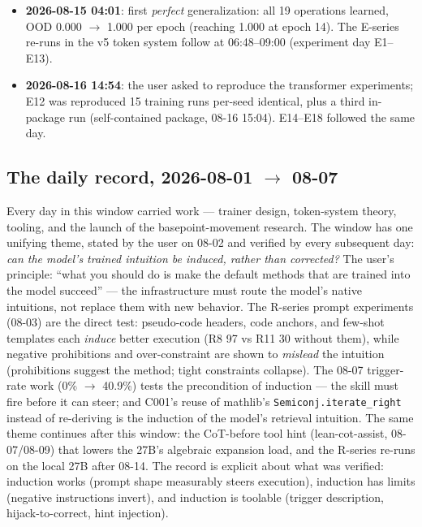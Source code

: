 \documentclass[sigplan,10pt,anonymous,review]{acmart}
\begin{document}
\begin{itemize}
distinct from the basepoint ($\mathrm{lambda}(\mathrm{base},
\mathrm{base})$), while the intended concept has none
($\mathrm{base}(\mathrm{base},\mathrm{base})$). Same day it becomes the
\texttt{pure-relative} branch of the Lean formalization (claim P001
PureBase; \texttt{C0NoGo}, \texttt{SelfRef}, \texttt{MinimalRuleAudit}).
\item \textbf{2026-08-15 04:01}: first \emph{perfect} generalization: all 19
operations learned, OOD 0.000 $\to$ 1.000 per epoch (reaching 1.000 at epoch
14). The E-series re-runs in the v5 token system follow at 06:48--09:00
(experiment day E1--E13).
\item \textbf{2026-08-16 14:54}: the user asked to reproduce the transformer
experiments; E12 was reproduced 15 training runs per-seed identical, plus a
third in-package run (self-contained package, 08-16 15:04). E14--E18
followed the same day.
\end{itemize}

\subsection{The daily record, 2026-08-01 $\to$ 08-07}

Every day in this window carried work --- trainer design, token-system
theory, tooling, and the launch of the basepoint-movement research. The
window has one unifying theme, stated by the user on 08-02 and verified
by every subsequent day: \emph{can the model's trained intuition be
induced, rather than corrected?} The user's principle: ``what you should
do is make the default methods that are trained into the model succeed''
--- the infrastructure must route the model's native intuitions, not
replace them with new behavior. The R-series prompt experiments (08-03)
are the direct test: pseudo-code headers, code anchors, and few-shot
templates each \emph{induce} better execution (R8 97 vs R11 30 without
them), while negative prohibitions and over-constraint are shown to
\emph{mislead} the intuition (prohibitions suggest the method; tight
constraints collapse). The 08-07 trigger-rate work (0\% $\to$ 40.9\%)
tests the precondition of induction --- the skill must fire before it can
steer; and C001's reuse of mathlib's \texttt{Semiconj.iterate\_right}
instead of re-deriving is the induction of the model's retrieval
intuition. The same theme continues after this window: the CoT-before
tool hint (lean-cot-assist, 08-07/08-09) that lowers the 27B's algebraic
expansion load, and the R-series re-runs on the local 27B after 08-14.
The record is explicit about what was verified: induction works (prompt
shape measurably steers execution), induction has limits (negative
instructions invert), and induction is toolable (trigger description,
hijack-to-correct, hint injection).
\end{document}
